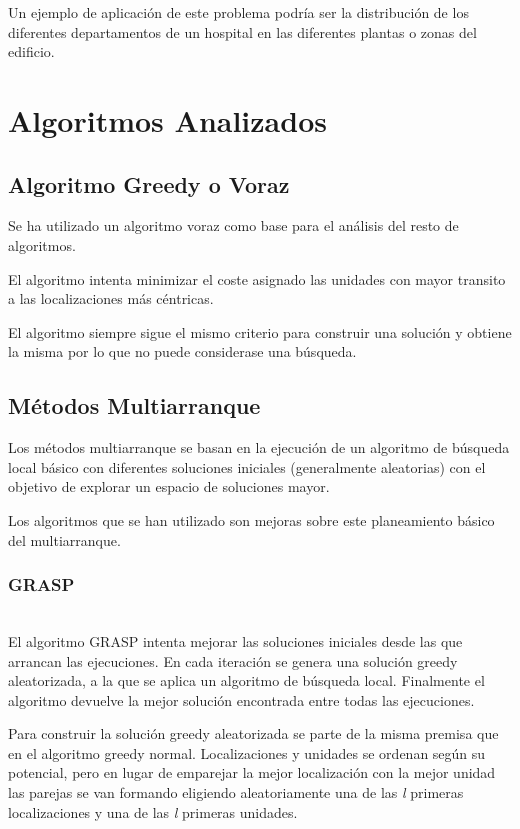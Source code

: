 \documentclass[runningheads,a4paper]{llncs}
\begin{document}
 Un ejemplo de aplicación de este problema podría ser la distribución de los diferentes departamentos de un hospital en las diferentes plantas o zonas del edificio.

\section{Algoritmos Analizados}

\subsection{Algoritmo Greedy o Voraz}

Se ha utilizado un algoritmo voraz como base para el análisis del resto de algoritmos.

El algoritmo intenta minimizar el coste asignado las unidades con mayor transito a las localizaciones más céntricas.

El algoritmo siempre sigue el mismo criterio para construir una solución y obtiene la misma por lo que no puede considerase una búsqueda.

\subsection{Métodos Multiarranque}

Los métodos multiarranque se basan en la ejecución de un algoritmo de búsqueda local básico con diferentes soluciones iniciales (generalmente aleatorias) con el objetivo de explorar un espacio de soluciones mayor.

Los algoritmos que se han utilizado son mejoras sobre este planeamiento básico del multiarranque.

\subsubsection{GRASP}
~\\

El algoritmo GRASP intenta mejorar las soluciones iniciales desde las que arrancan las ejecuciones. En cada iteración se genera una solución greedy aleatorizada, a la que se aplica un algoritmo de búsqueda local. Finalmente el algoritmo devuelve la mejor solución encontrada entre todas las ejecuciones.

Para construir la solución greedy aleatorizada se parte de la misma premisa que en el algoritmo greedy normal. Localizaciones y unidades se ordenan según su potencial, pero en lugar de emparejar la mejor localización con la mejor unidad las parejas se van formando eligiendo aleatoriamente una de las \emph{l} primeras localizaciones y una de las \emph{l} primeras unidades.
\end{document}
